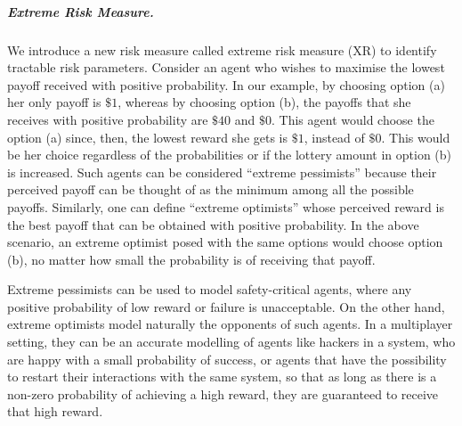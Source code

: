 \subparagraph*{Extreme Risk Measure.} We introduce a new risk measure called extreme risk measure (XR) to identify tractable risk parameters. %
%
Consider an agent who wishes to maximise the lowest payoff received with positive probability.
In our example, 
by choosing option (a) her only payoff is $\$1$, whereas by choosing option (b), the payoffs that she receives with positive probability are $\$40$ and $\$0$. 
This agent would choose the option (a) since, then, the lowest reward she gets is $\$1$, instead of $\$0$. This would be her choice regardless of the probabilities or if the lottery amount in option (b) is increased.
Such agents can be considered ``extreme pessimists'' because
their perceived payoff can be thought of as the minimum among all the possible payoffs.
Similarly, one can define ``extreme optimists''  whose perceived reward is the best payoff that can be obtained with positive probability.
In the above scenario, an extreme optimist posed with the same options would choose option (b), no matter how small the probability is of receiving that payoff.

Extreme pessimists can be used to model safety-critical agents, where any positive probability of low reward or failure is unacceptable.
On the other hand, extreme optimists model naturally the opponents of such agents.
In a multiplayer setting, they can be an accurate modelling of agents like hackers in a system, who are happy with a small probability of success, or agents that have the possibility to restart their interactions with the same system, so that as long as there is a non-zero probability of achieving a high reward, they are guaranteed to receive that high reward. %





